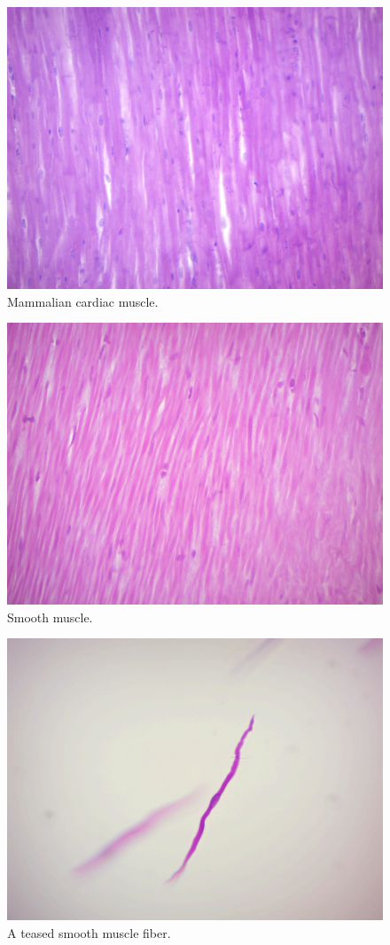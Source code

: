 \begin{figure}

{\centering \includegraphics[width=0.7\linewidth]{./figures/tissues/cardiac_muscle}

}

\caption{Mammalian cardiac muscle.}\label{fig:cardiac}
\end{figure}




\begin{figure}

{\centering \includegraphics[width=0.7\linewidth]{./figures/tissues/smooth_muscle}

}

\caption{Smooth muscle.}\label{fig:smooth}
\end{figure}

\begin{figure}

{\centering \includegraphics[width=0.7\linewidth]{./figures/tissues/smooth_muscle_teased}

}

\caption{A teased smooth muscle fiber.}\label{fig:teased}
\end{figure}

